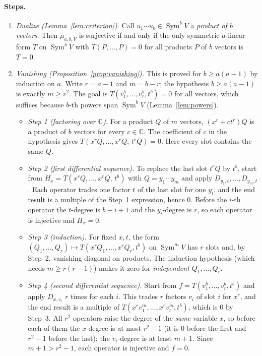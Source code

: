 \documentclass[11pt]{article}
\theoremstyle{remark}
\DeclareMathOperator{\Sym}{Sym}
\newcommand{\C}{\mathbb C}
\newcommand{\D}[2]{D_{#1,#2}}
\begin{document}
\paragraph{Steps.}
\begin{enumerate}[leftmargin=2em]
\item \emph{Dualize (Lemma~\ref{lem:criterion}).} Call $u_1\cdots u_b\in
\Sym^bV$ a \emph{product of $b$ vectors}. Then $\mu_{a,b,V}$ is surjective if
and only if the only symmetric $a$-linear form $T$ on $\Sym^bV$ with
$T(P,\dots,P)=0$ for all products $P$ of $b$ vectors is $T=0$.
\item \emph{Vanishing (Proposition~\ref{prop:vanishing}).} This is proved
for $b\ge a(a-1)$ by induction on $a$. Write $r=a-1$ and $m=b-r$; the
hypothesis $b\ge a(a-1)$ is exactly $m\ge r^2$. The goal is
$T(v_1^b,\dots,v_r^b,t^b)=0$ for all vectors, which suffices because
$b$-th powers span $\Sym^bV$ (Lemma~\ref{lem:powers}).
 \begin{itemize}[leftmargin=1.5em]
 \item \emph{Step 1 (factoring over $\C$).} For a product $Q$ of $m$
 vectors, $(x^r+ct^r)Q$ is a product of $b$ vectors for every $c\in\C$.
 The coefficient of $c$ in the hypothesis gives
 $T(x^rQ,\dots,x^rQ,\,t^rQ)=0$. Here every slot contains the same $Q$.
 \item \emph{Step 2 (first differential sequence).} To replace the last
 slot $t^rQ$ by $t^b$, start from $H_x=T(x^rQ,\dots,x^rQ,\,t^b)$ with
 $Q=y_1\cdots y_m$ and apply $\D{y_1}{t},\dots,\D{y_m}{t}$. Each operator
 trades one factor $t$ of the last slot for one $y_i$, and the end result
 is a multiple of the Step~1 expression, hence $0$. Before the $i$-th
 operator the $t$-degree is $b-i+1$ and the $y_i$-degree is $r$, so each
 operator is injective and $H_x=0$.
 \item \emph{Step 3 (induction).} For fixed $x,t$, the form
 $(Q_1,\dots,Q_r)\mapsto T(x^rQ_1,\dots,x^rQ_r,t^b)$ on $\Sym^mV$ has $r$
 slots and, by Step~2, vanishing diagonal on products. The induction
 hypothesis (which needs $m\ge r(r-1)$) makes it zero for
 \emph{independent} $Q_1,\dots,Q_r$.
 \item \emph{Step 4 (second differential sequence).} Start from
 $f=T(v_1^b,\dots,v_r^b,t^b)$ and apply $\D{x}{v_i}$ $r$ times for each
 $i$. This trades $r$ factors $v_i$ of slot $i$ for $x^r$, and the end
 result is a multiple of $T(x^rv_1^m,\dots,x^rv_r^m,t^b)$, which is $0$ by
 Step~3. All $r^2$ operators raise the degree of the \emph{same} variable
 $x$, so before each of them the $x$-degree is at most $r^2-1$ (it is $0$
 before the first and $r^2-1$ before the last); the $v_i$-degree is at
 least $m+1$. Since $m+1>r^2-1$, each operator is injective and $f=0$.
 \end{itemize}
\end{enumerate}
\end{document}
